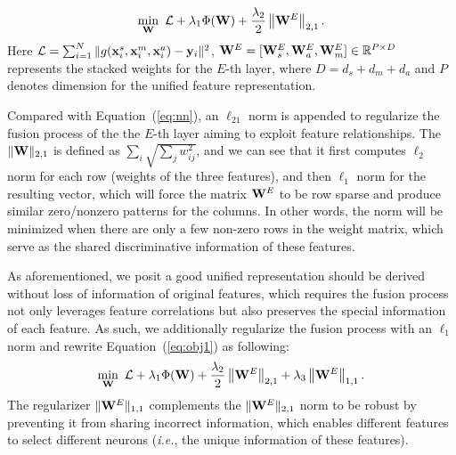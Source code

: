 \documentclass[journal]{IEEEtran}
\makeatletter
\newcommand*{\ie}{\emph{i.e.}\@\xspace}
\makeatother
\begin{document}
\begin{equation}
\label{eq:obj1}
  \min_{{\bf W}}~\mathcal{L} + \lambda_1 \Phi({\bf W})
+\frac{\lambda_{2}}{2}\left \| {\bf W}^{E} \right \|_{2,1}.
\end{equation}
Here $\mathcal{L} =  \sum_{i=1}^{N} \|  g({\bf x}_{i}^{s},{\bf x}_{i}^{m}, {\bf x}_{i}^{a})-{\bf y}_i \|^2$,  ${\bf W}^E = [{\bf W}^{E}_{s},  {\bf W}^{E}_{a}, {\bf W}^{E}_{m}] \in \mathbb{R}^{P \times D}$ represents the stacked weights for the $E$-th layer, where $D = d_s + d_m + d_a$ and $P$ denotes dimension for the unified feature representation. 

Compared with Equation~(\ref{eq:nn}), an $\ell_{21}$ norm is appended to regularize the fusion process of the the $E$-th layer aiming to exploit feature relationships. The $\|{\bf W}\|_{2,1}$ is defined as $\sum_i \sqrt{\sum_j w_{ij}^2}$, and we can see that it first computes $\ell_2$ norm for each row (weights of the three features), and then $\ell_1$ norm for the resulting vector, which will force the matrix ${\bf W}^E$ to be row sparse and produce similar zero/nonzero patterns for the columns. 
In other words, the norm will be minimized when there are only a few non-zero rows in the weight matrix, which serve as the shared discriminative information of these features.

As aforementioned, we posit a good unified representation should be derived without loss of information of original features, which requires the fusion process not only leverages feature correlations but also preserves the special information of each feature. As such, we additionally regularize the fusion process with an $\ell_1$ norm and rewrite Equation~(\ref{eq:obj1}) as following:
\begin{equation}
\label{eq:obj}
  \min_{{\bf W}}~\mathcal{L} + \lambda_1 \Phi({\bf W}) +\frac{\lambda_{2}}{2}\left \| {\bf W}^{E} \right \|_{2,1} + \lambda_{3}\left \| {\bf W}^{E} \right \|_{1,1}.
\end{equation}
The regularizer $\|{\bf W}^E\|_{1,1}$ complements the $\|{\bf W}^E\|_{2,1}$ norm to be robust by preventing it from sharing incorrect information, which enables different features to select different neurons (\ie, the unique information of these features).
\end{document}
